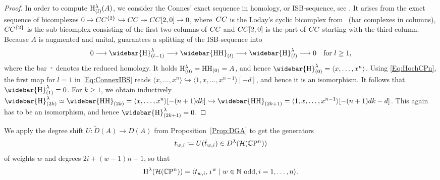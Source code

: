 \documentclass[\MainFolder/Text.tex]{subfiles}
\begin{document}
\begin{proof}
In order to compute $\mathrm{H}^{\lambda}_{(l)}(A)$, we consider the Connes' exact sequence in homology, or $\mathrm{ISB}$-sequence, see \cite[Theorem~2.2.1]{LodayCyclic}.
It arises from the exact sequence of bicomplexes $0 \rightarrow CC^{\{2\}} \hookrightarrow CC \twoheadrightarrow CC[2,0] \rightarrow 0$, where~$CC$ is the Loday's cyclic bicomplex from~\cite[Paragraph~2.1.2]{LodayCyclic} (bar complexes in columns), $CC^{\{2\}}$ is the sub-bicomplex consisting of the first two columns of $CC$ and $CC[2,0]$ is the part of $CC$ starting with the third column. 
Because $A$ is augmented and unital, \cite[Theorem~4.1.13]{LodayCyclic} guarantees a splitting of the ISB-sequence into
\begin{equation}\label{Eq:ConnexIBS}
0 \longrightarrow \widebar{\H}^\lambda_{(l-1)} \longrightarrow \widebar{\H\H}_{(l)} \longrightarrow \widebar{\H}^\lambda_{(l)} \longrightarrow 0\quad\text{for }l\ge 1,
\end{equation}
where the bar $\bar{\cdot}$ denotes the reduced homology. It holds $\mathrm{H}^{\lambda}_{(0)}= \mathrm{H}\mathrm{H}_{(0)}= A$, and hence $\widebar{\H}^\lambda_{(0)} = \langle x, \dotsc, x^n \rangle$.
Using \eqref{Eq:HochCPn}, the first map for $l=1$ in \eqref{Eq:ConnexIBS} reads $\langle x,\dotsc, x^n \rangle \hookrightarrow \langle 1, x, \dotsc, x^{n-1}\rangle[-d]$, and hence it is an isomorphism.
It follows that $\widebar{\H}^\lambda_{(1)} = 0$.
For $k\ge 1$, we obtain inductively $\widebar{\H}^\lambda_{(2k)} \simeq \widebar{\H\H}_{(2k)} = \langle x,\dotsc,x^n\rangle[-(n+1)dk] \hookrightarrow \widebar{\H\H}_{(2k+1)} = \langle 1, x, \dotsc, x^{n-1} \rangle[-(n+1)dk - d]$. This again has to be an isomorphism, and hence $\widebar{\H}^\lambda_{(2k+1)} = 0$.
\end{proof}
We apply the degree shift $U: \tilde{D}(A) \rightarrow D(A)$ from Proposition~\ref{Prop:DGA} to get the generators
\[ t_{w,i} \coloneqq U(\tilde{t}_{w,i}) \in D^\lambda( \mathcal{H}(\mathbb{C}\mathrm{P}^n)) \]
of weights $w$ and degrees $2i+ (w-1)n -1$, so that
\[ \H^\lambda(\Harm(\CP^n)) = \langle t_{w,i}, \NOne^{w} \mid w\in \N \text{ odd}, i=1,\dotsc, n\rangle. \]
\end{document}
